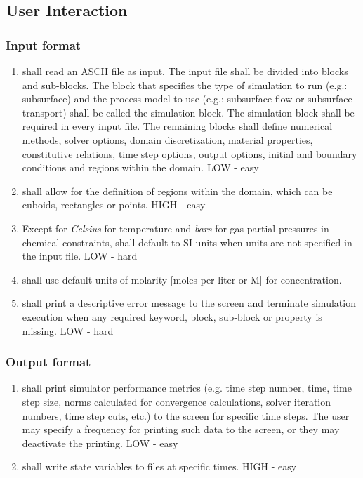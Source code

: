 \subsection{User Interaction}
\subsubsection{Input format}
\begin{enumerate}
	\item \pft shall read an ASCII file as input. The input file shall be divided into blocks and sub-blocks. The block that specifies the type of simulation to run (e.g.: subsurface) and the process model to use (e.g.: subsurface flow or subsurface transport) shall be called the simulation block. The simulation block shall be required in every input file. The remaining blocks shall define numerical methods, solver options, domain discretization, material properties, constitutive relations, time step options, output options, initial and boundary conditions and regions within the domain. \label{inputFile} LOW - easy
	\item \pft shall allow for the definition of regions within the domain, which can be cuboids, rectangles or points. \label{inputRegions} HIGH - easy
	\item Except for \textit{Celsius} for temperature and \textit{bars} for gas partial pressures in chemical constraints, \pft shall default to SI units when units are not specified in the input file. \label{inputUnitsValues} LOW - hard
	\item \pft shall use default units of molarity [moles per liter or M] for concentration.
	\item \pft shall print a descriptive error message to the screen and terminate simulation execution when any required keyword, block, sub-block or property is missing. \label{inputErrors} LOW - hard
\end{enumerate}

\subsubsection{Output format}
\begin{enumerate}[resume]
	\item \pft shall print simulator performance metrics (e.g. time step number, time, time step size, norms calculated for convergence calculations, solver iteration numbers, time step cuts, etc.) to the screen for specific time steps. The user may specify a frequency for printing such data to the screen, or they may deactivate the printing. \label{outputPrintScreen} LOW - easy
	\item \pft shall write state variables to files at specific times. \label{outputSpecs} HIGH - easy
\end{enumerate}

